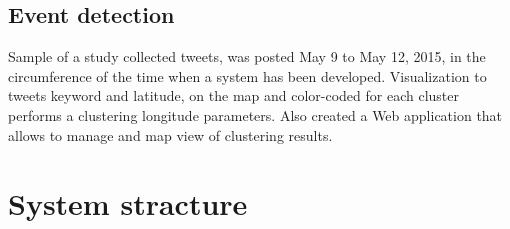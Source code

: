 
\subsection{Event detection}
Sample of a study collected tweets, was posted May 9 to May 12, 2015, in the circumference of the time when a system has been developed.
Visualization to tweets keyword and latitude, on the map and color-coded for each cluster performs a clustering longitude parameters.
Also created a Web application that allows to manage and map view of clustering results.



\newpage

\section{System stracture}
